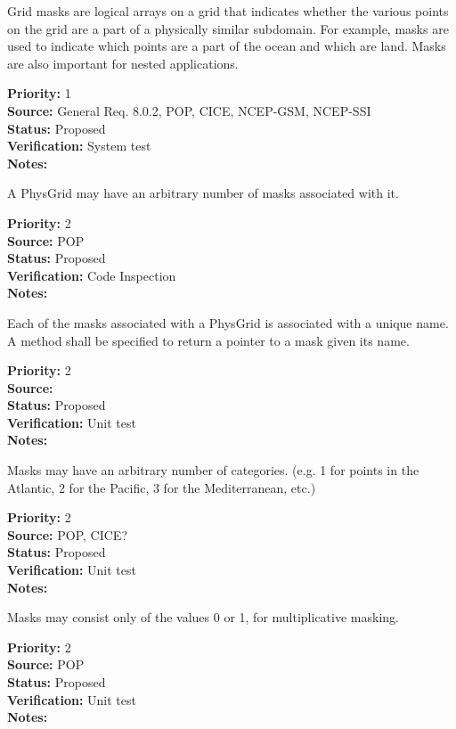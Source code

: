 Grid masks are logical arrays on a grid that indicates whether the various
points on the grid are a part of a physically similar subdomain. For example,
masks are used to indicate which points are a part of the ocean and which are
land.  Masks are also important for nested applications.

\begin{reqlist}
{\bf Priority:} 1 \\
{\bf Source:} General Req. 8.0.2, POP, CICE, NCEP-GSM, NCEP-SSI \\
{\bf Status:} Proposed \\
{\bf Verification:} System test\\
{\bf Notes:} 
\end{reqlist}

A PhysGrid may have an arbitrary number of masks associated with it.
\begin{reqlist}
{\bf Priority:} 2 \\
{\bf Source:} POP \\
{\bf Status:} Proposed \\
{\bf Verification:} Code Inspection\\
{\bf Notes:} 
\end{reqlist}

Each of the masks associated with a PhysGrid is associated with a
unique name.  A method shall be specified to return a pointer to a mask given
its name.
\begin{reqlist}
{\bf Priority:} 2 \\
{\bf Source:}  \\
{\bf Status:} Proposed \\
{\bf Verification:} Unit test\\
{\bf Notes:} 
\end{reqlist}

Masks may have an arbitrary number of categories. (e.g. 1 for points in the
Atlantic, 2 for the Pacific, 3 for the Mediterranean, etc.)
\begin{reqlist}
{\bf Priority:} 2 \\
{\bf Source:} POP, CICE? \\
{\bf Status:} Proposed \\
{\bf Verification:} Unit test\\
{\bf Notes:} 
\end{reqlist}

Masks may consist only of the values 0 or 1, for multiplicative masking.
\begin{reqlist}
{\bf Priority:} 2 \\
{\bf Source:} POP \\
{\bf Status:} Proposed \\
{\bf Verification:} Unit test\\
{\bf Notes:} 
\end{reqlist}

